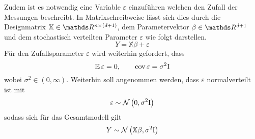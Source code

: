 		Zudem ist es notwendig eine Variable $\varepsilon$ einzuführen welchen den Zufall der Messungen beschreibt.
	    In Matrixschreibweise lässt sich dies durch die Designmatrix $\mathbb{X} \in \SR^{n \times (d+1)}$, dem Parametervektor $\beta \in \SR^{d+1}$ und dem stochastisch  verteilten Parameter $\varepsilon$ wie folgt darstellen.
		\[
			Y = \mathbb{X}\beta + \varepsilon
		\]
		Für den Zufallsparameter $\varepsilon$ wird weiterhin gefordert, dass
		\[
			\operatorname{\mathbb{E}} \varepsilon = 0, \qquad \operatorname{cov} \varepsilon = \sigma^2 \mathrm{I}
		\]
		wobei $\sigma^2 \in (0,\infty)$.
		Weiterhin soll angenommen werden, dass $\varepsilon$ normalverteilt ist mit
	    \[
			\varepsilon \sim \mathcal{N} \left( 0,\sigma^2\mathrm{I} \right)
		\]
	    sodass sich für das Gesamtmodell gilt
		\[
			Y \sim \mathcal{N} \left( \mathbb{X}\beta,\sigma^2 \mathrm{I} \right)
		\]



